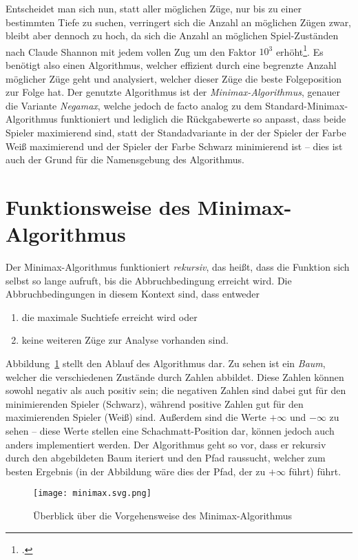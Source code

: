 Entscheidet man sich nun, statt aller möglichen Züge, nur bis zu einer bestimmten Tiefe zu suchen, verringert sich die Anzahl an möglichen Zügen zwar, bleibt aber dennoch zu hoch, da sich die Anzahl an möglichen Spiel-Zuständen nach Claude Shannon mit jedem vollen Zug um den Faktor $10^{3}$ erhöht\footcite{shannon}. Es benötigt also einen Algorithmus, welcher effizient durch eine begrenzte Anzahl möglicher Züge geht und analysiert, welcher dieser Züge die beste Folgeposition zur Folge hat. Der genutzte Algorithmus ist der \textit{Minimax-Algorithmus}, genauer die Variante \textit{Negamax}, welche jedoch de facto analog zu dem Standard-Minimax-Algorithmus funktioniert und lediglich die Rückgabewerte so anpasst, dass beide Spieler maximierend sind, statt der Standadvariante in der der Spieler der Farbe Weiß maximierend und der Spieler der Farbe Schwarz minimierend ist -- dies ist auch der Grund für die Namensgebung des Algorithmus.

\section{Funktionsweise des Minimax-Algorithmus}
Der Minimax-Algorithmus funktioniert \textit{rekursiv}, das heißt, dass die Funktion sich selbst so lange aufruft, bis die Abbruchbedingung erreicht wird. Die Abbruchbedingungen in diesem Kontext sind, dass entweder 

\begin{enumerate}
    \item die maximale Suchtiefe erreicht wird oder
    \item keine weiteren Züge zur Analyse vorhanden sind.
\end{enumerate}

Abbildung~\ref{fig:minimax} stellt den Ablauf des Algorithmus dar. Zu sehen ist ein \textit{Baum}, welcher die verschiedenen Zustände durch Zahlen abbildet. Diese Zahlen können sowohl negativ als auch positiv sein; die negativen Zahlen sind dabei gut für den minimierenden Spieler (Schwarz), während positive Zahlen gut für den maximierenden Spieler (Weiß) sind. Außerdem sind die Werte $+\infty$ und $-\infty$ zu sehen -- diese Werte stellen eine Schachmatt-Position dar, können jedoch auch anders implementiert werden. Der Algorithmus geht so vor, dass er rekursiv durch den abgebildeten Baum iteriert und den Pfad raussucht, welcher zum besten Ergebnis (in der Abbildung wäre dies der Pfad, der zu $+\infty$ führt) führt.

\begin{figure}[H]
	\texttt{[image: minimax.svg.png]}
	\caption{Überblick über die Vorgehensweise des Minimax-Algorithmus\footnotemark}
	\label{fig:minimax}
\end{figure}

